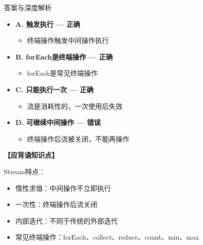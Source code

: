 \documentclass[12pt, a4paper]{ctexart}
\begin{document}
\begin{enumerate}[label=\textbf{\arabic*.}]
\begin{bluebox}{答案与深度解析}
\begin{itemize}[label={}, leftmargin=*, nosep]
		      
		      \item \textbf{A. 触发执行 — 正确}
					  \begin{itemize}[label={}, nosep]
		      
			      \item 终端操作触发中间操作执行
		      

					  \end{itemize}
		      \item \textbf{B. forEach是终端操作 — 正确}
					  \begin{itemize}[label={}, nosep]
		      
			      \item forEach是常见终端操作
		      

					  \end{itemize}
		      \item \textbf{C. 只能执行一次 — 正确}
					  \begin{itemize}[label={}, nosep]
		      
			      \item 流是消耗性的，一次使用后失效
		      

					  \end{itemize}
		      \item \textbf{D. 可继续中间操作 — 错误}
					  \begin{itemize}[label={}, nosep]
		      
			      \item 终端操作后流被关闭，不能再操作
		      
		      

		      
					  \end{itemize}
					  \end{itemize}
\textbf{【应背诵知识点】}

		      Stream特点：
		      \begin{itemize}[label={}, nosep]
			      \item 惰性求值：中间操作不立即执行
			      \item 一次性：终端操作后流关闭
			      \item 内部迭代：不同于传统的外部迭代
			      \item 常见终端操作：forEach、collect、reduce、count、min、max
		      \end{itemize}
	      \end{bluebox}

\end{enumerate}
\end{document}
